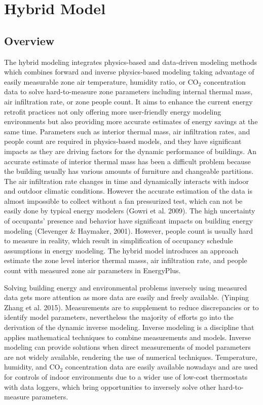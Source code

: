 \section{Hybrid Model}\label{hybrid-model}

\subsection{Overview}

The hybrid modeling integrates physics-based and data-driven modeling methods which combines forward and inverse physics-based modeling taking advantage of easily measurable zone air temperature, humidity ratio, or CO$_2$ concentration data to solve hard-to-measure zone parameters including internal thermal mass, air infiltration rate, or zone people count. It aims to enhance the current energy retrofit practices not only offering more user-friendly energy modeling environments but also providing more accurate estimates of energy savings at the same time. Parameters such as interior thermal mass, air infiltration rates, and people count are required in physics-based models, and they have significant impacts as they are driving factors for the dynamic performance of buildings. An accurate estimate of interior thermal mass has been a difficult problem because the building usually has various amounts of furniture and changeable partitions. The air infiltration rate changes in time and dynamically interacts with indoor and outdoor climatic conditions. However the accurate estimation of the data is almost impossible to collect without a fan pressurized test, which can not be easily done by typical energy modelers (Gowri et al. 2009). The high uncertainty of occupants’ presence and behavior have significant impacts on building energy modeling (Clevenger \& Haymaker, 2001). However, people count is usually hard to measure in reality, which result in simplification of occupancy schedule assumptions in energy modeling. The hybrid model introduces an approach estimate the zone level interior thermal masss, air infiltration rate, and people count with measured zone air parameters in EnergyPlus.

Solving building energy and environmental problems inversely using measured data gets more attention as more data are easily and freely available. (Yinping Zhang et al. 2015). Measurements are to supplement to reduce discrepancies or to identify model parameters, nevertheless the majority of efforts go into the derivation of the dynamic inverse modeling. Inverse modeling is a discipline that applies mathematical techniques to combine measurements and models. Inverse modeling can provide solutions when direct measurements of model parameters are not widely available, rendering the use of numerical techniques. Temperature, humidity, and CO$_2$ concentration data are easily available nowadays and are used for controls of indoor environments due to a wider use of low-cost thermostats with data loggers, which bring opportunities to inversely solve other hard-to-measure parameters.

